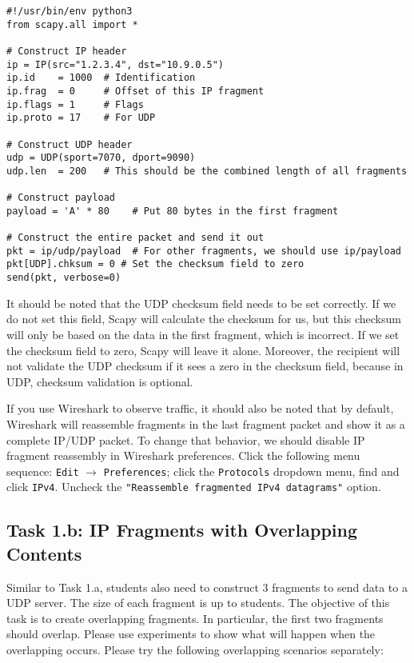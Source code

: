 \begin{lstlisting}
#!/usr/bin/env python3
from scapy.all import *

# Construct IP header
ip = IP(src="1.2.3.4", dst="10.9.0.5")
ip.id    = 1000  # Identification
ip.frag  = 0     # Offset of this IP fragment
ip.flags = 1     # Flags
ip.proto = 17    # For UDP

# Construct UDP header
udp = UDP(sport=7070, dport=9090)
udp.len  = 200   # This should be the combined length of all fragments

# Construct payload
payload = 'A' * 80    # Put 80 bytes in the first fragment

# Construct the entire packet and send it out
pkt = ip/udp/payload  # For other fragments, we should use ip/payload
pkt[UDP].chksum = 0 # Set the checksum field to zero
send(pkt, verbose=0)
\end{lstlisting}


It should be noted that the UDP checksum field needs to be set 
correctly. If we do not set this field, Scapy will calculate 
the checksum for us, but this checksum will only be based on the 
data in the first fragment, which is incorrect.
If we set the checksum field to  zero, Scapy will leave it alone.
Moreover, the recipient will not validate the UDP checksum 
if it sees a zero in the checksum field, 
because in UDP, checksum validation is optional.


If you use Wireshark to observe traffic, it should also be noted that by default, 
Wireshark will reassemble fragments in the last fragment packet and
show it as a complete IP/UDP packet. To change that behavior,
we should disable IP fragment reassembly in Wireshark preferences.
Click the following menu sequence: \texttt{Edit} $\rightarrow$ \texttt{Preferences}; 
click the \texttt{Protocols} dropdown menu, find and click \texttt{IPv4}.
Uncheck the \texttt{"Reassemble fragmented IPv4 datagrams"} option. 




\subsection{Task 1.b: IP Fragments with Overlapping Contents}

Similar to Task 1.a, students also need to construct 3 fragments to send data to a UDP server.
The size of each fragment is up to students.  The objective of this task is to create
overlapping fragments.  In particular, the first two fragments should overlap.  Please use
experiments to show what will happen when the overlapping occurs. Please
try the following overlapping scenarios separately:
 
